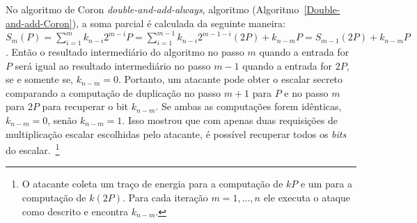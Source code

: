 No algoritmo de Coron \textit{double-and-add-always}, algoritmo (Algoritmo~\ref{Double-and-add-Coron}), a soma parcial é calculada da seguinte maneira: $S_m(P) = \sum_{i=1}^{m}k_{n-i}2^{m-i} P=\sum_{i=1}^{m-1}k_{n-i}2^{m-1-i}(2P)+k_{n-m}P= S_{m-1}(2P)+k_{n-m}P$. Então o resultado intermediário do algoritmo no passo $m$ quando a entrada for $P$ será igual ao resultado intermediário no passo $m-1$ quando a entrada for $2P$, se e somente se, $k_{n-m} = 0$. Portanto, um atacante pode obter o escalar secreto comparando a computação de duplicação no passo $m+1$ para $P$ e no passo $m$ para $2P$ para recuperar o bit $k_{n-m}$. Se ambas as computações forem idênticas, $k_{n-m} = 0$, senão $k_{n-m} = 1$. Isso mostrou que com apenas duas requisições de multiplicação escalar escolhidas pelo atacante, é possível recuperar todos os \textit{bits} do escalar.~\footnote{O atacante coleta um traço de energia para a computação de $kP$ e um para a computação de $k(2P)$. Para cada iteração $m=1,...,n$ ele executa o ataque como descrito e encontra $k_{n-m}$.}

